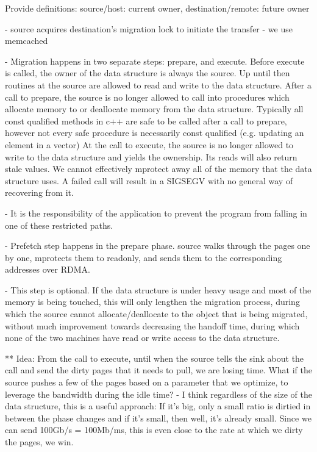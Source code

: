Provide definitions: source/host: current owner, destination/remote: future owner

- source acquires destination's migration lock to initiate the transfer
    - we use memcached

- Migration happens in two separate steps: prepare, and execute. Before execute
  is called, the owner of the data structure is always the source. Up until then
  routines at the source are allowed to read and write to the data structure.
  After a call to prepare, the source is no longer allowed to call into
  procedures which allocate memory to or deallocate memory from the data structure. Typically all const qualified methods in c++ 
  are safe to be called after a call to prepare, however not every safe procedure is necessarily const qualified (e.g. updating an element in a vector)
  At the call to execute, the source is no longer allowed to write to the data structure and yields the ownership. Its reads will also return stale values.
  We cannot effectively mprotect away all of the memory that the data structure uses. A failed call will result in a SIGSEGV with no general way of
  recovering from it.

  - It is the responsibility of the application to prevent the program from falling in one of these restricted paths.



- Prefetch step happens in the prepare phase. source walks through the pages one by one, mprotects them to readonly, and
  sends them to the corresponding addresses over RDMA.

  - This step is optional. If the data structure is under heavy usage and most of the memory is being touched, this
  will only lengthen the migration process, during which the source cannot allocate/deallocate to the object that is being
  migrated, without much improvement towards decreasing the handoff time, during which
  none of the two machines have read or write access to the data structure.


** Idea: From the call to execute, until when the source tells the sink about the call and send the
dirty pages that it needs to pull, we are losing time. What if the source pushes a few of the pages
based on a parameter that we optimize, to leverage the bandwidth during the idle time?
 - I think regardless of the size of the data structure, this is a useful approach: If it's big,
 only a small ratio is dirtied in between the phase changes and if it's small, then well, it's already small.
 Since we can send 100Gb/s = 100Mb/ms, this is even close to the rate at which we dirty the pages, we win.


